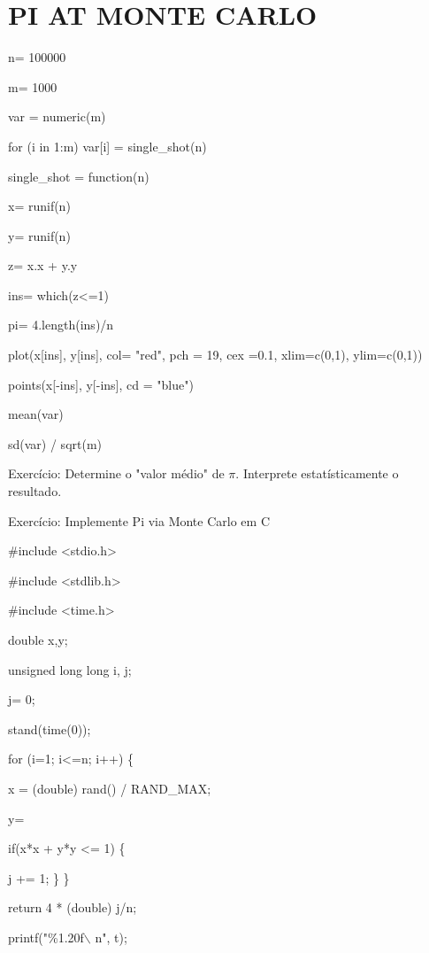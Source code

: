 \documentclass[a4paper, 12pt]{article}
\begin{document}
\section{PI AT MONTE CARLO}

n= 100000

m= 1000

var = numeric(m)

for (i in 1:m) var[i] = single\_shot(n)

single\_shot = function(n)

x= runif(n)

y= runif(n)

z= x.x + y.y

ins= which(z<=1)

pi= 4.length(ins)/n

plot(x[ins], y[ins], col= "red", pch = 19, cex =0.1, xlim=c(0,1), ylim=c(0,1))

points(x[-ins], y[-ins], cd = "blue")

mean(var)

sd(var) / sqrt(m)

Exercício: Determine o "valor médio" de $\pi$. Interprete estatísticamente o resultado.

Exercício: Implemente Pi via Monte Carlo em C

\#include <stdio.h>

\#include <stdlib.h>

\#include <time.h>

double x,y;

unsigned long long i, j;

j= 0;

stand(time(0));

for (i=1; i<=n; i++) \{

x = (double) rand() / RAND\_MAX;

y=

if(x*x + y*y <= 1) \{

j += 1;
\}
\}

return 4 * (double) j/n;

printf("\%1.20f$\backslash$ n", t);
\end{document}

